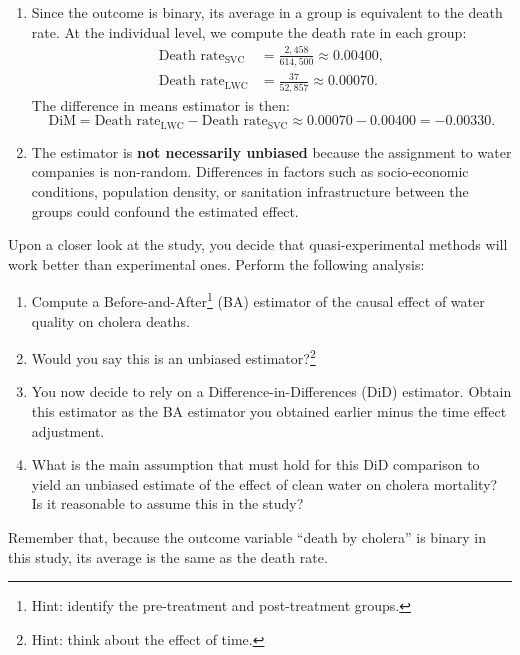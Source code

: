 \documentclass[11pt]{exam}
\begin{document}
\begin{questions}
\begin{solution}[0cm]
\begin{enumerate}[label=(\alph*)]
        \item Since the outcome is binary, its average in a group is equivalent to the death rate. At the individual level, we compute the death rate in each group:
        \begin{align*}
            \text{Death rate}_{\text{SVC}} &= \frac{2,458}{614,500} \approx 0.00400, \\
            \text{Death rate}_{\text{LWC}} &= \frac{37}{52,857} \approx 0.00070.
        \end{align*}
        The difference in means estimator is then:
        \[
        \mathrm{DiM} = \text{Death rate}_{\text{LWC}} - \text{Death rate}_{\text{SVC}} \approx 0.00070 - 0.00400 = \boxed{-0.00330}.
        \]
        
        \item The estimator is \textbf{not necessarily unbiased} because the assignment to water companies is non-random. Differences in factors such as socio-economic conditions, population density, or sanitation infrastructure between the groups could confound the estimated effect.
    \end{enumerate}
    
\end{solution}

\question[3.5]
Upon a closer look at the study, you decide that quasi-experimental methods will work better than experimental ones. Perform the following analysis:
\begin{enumerate}[label=(\alph*)]
  \item Compute a Before-and-After\footnote{Hint: identify the pre-treatment and post-treatment groups.} (BA) estimator of the causal effect of water quality on cholera deaths.
  \item Would you say this is an unbiased estimator?\footnote{Hint: think about the effect of time.} 
  \item You now decide to rely on a Difference-in-Differences (DiD) estimator. Obtain this estimator as the BA estimator you obtained earlier minus the time effect adjustment.
  \item What is the main assumption that must hold for this DiD comparison to yield an unbiased estimate of the effect of clean water on cholera mortality? Is it reasonable to assume this in the study?  
\end{enumerate}

\begin{solution}[0cm]
    Remember that, because the outcome variable ``death by cholera'' is binary in this study, its average is the same as the death rate.
    

\end{solution}
\end{questions}
\end{document}
